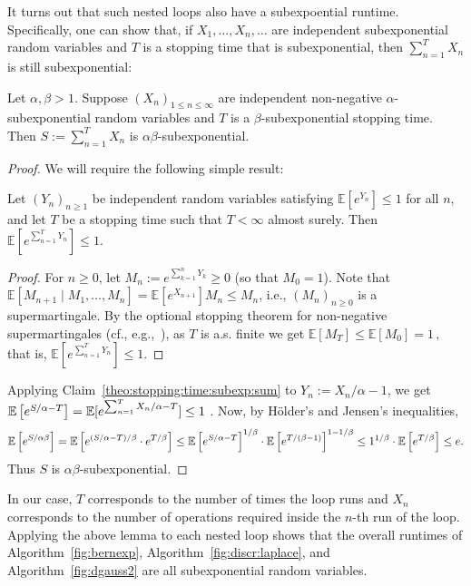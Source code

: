 \documentclass{jpc}
\newcommand{\ex}[2]{{\ifx&#1& \mathbb{E} \else
\underset{#1}{\mathbb{E}} \fi \left[#2\right]}}
\newcommand{\eqdef}{:=}
\begin{document}
It turns out that such nested loops also have a subexpoential runtime. Specifically, one can show that, if $X_1,\dots,X_n,\dots$ are independent subexponential random variables and $T$ is a stopping time that is subexponential, then $\sum_{n=1}^T X_n$ is still subexponential:
\begin{lem}
Let $\alpha,\beta>1$.
Suppose $(X_n)_{1\leq n\leq \infty}$ are independent non-negative $\alpha$-subexponential random variables and $T$ is a $\beta$-subexponential stopping time. Then $S \eqdef \sum_{n=1}^T X_n$ is $\alpha\beta$-subexponential.
\end{lem}
\begin{proof}
We will require the following simple result:
\begin{clm}
  \label{theo:stopping:time:subexp:sum}
Let $(Y_n)_{n\geq 1}$ be independent random variables satisfying $\mathbb{E}[e^{Y_n}] \leq 1$ for all $n$, and let $T$ be a stopping time such that $T < \infty$ almost surely. Then $\mathbb{E}[e^{\sum_{n=1}^T Y_n}] \leq 1$.
\end{clm}
\begin{proof}
    For $n\geq 0$, let $M_n \eqdef e^{\sum_{k=1}^n Y_k} \geq 0$ (so that $M_0=1$). Note that 
    $
      \mathbb{E}[ M_{n+1} \mid M_1,\dots, M_n ] = \mathbb{E}[ e^{X_{n+1}} ] M_n \leq M_n
    $, i.e., $(M_n)_{n\geq 0}$ is a supermartingale. By the optional stopping theorem for non-negative supermartingales (cf., e.g.,~\cite[Corollary~10.10(d)]{Williams91}), as $T$ is a.s. finite we get
    $
        \mathbb{E}[ M_T ] \leq \mathbb{E}[ M_0 ] = 1 \,,
    $
    that is, $\mathbb{E}[ e^{\sum_{n=1}^T Y_n} ] \leq 1$.
\end{proof}
Applying Claim~\ref{theo:stopping:time:subexp:sum} to $Y_n \eqdef X_n/\alpha-1$, we get
$
    \ex{}{e^{S/\alpha-T}}=\mathbb{E}[ e^{\sum_{n=1}^T X_n/\alpha - T} ] \leq 1
$ 
. 
Now, by H\"older's and Jensen's inequalities,
\[
    \ex{}{e^{S/\alpha\beta}} = \ex{}{e^{(S/\alpha-T)/\beta} \cdot e^{T/\beta}} \le \ex{}{e^{S/\alpha-T}}^{1/\beta} \cdot \ex{}{e^{T/(\beta-1)}}^{1-1/\beta} \le 1^{1/\beta} \cdot \ex{}{e^{T/\beta}} \le e.
\]
Thus $S$ is $\alpha\beta$-subexponential.
\end{proof}
In our case, $T$ corresponds to the number of times the loop runs and $X_n$ corresponds to the number of operations required inside the $n$-th run of the loop. Applying the above lemma to each nested loop shows that the overall runtimes of Algorithm~\ref{fig:bernexp}, Algorithm~\ref{fig:discr:laplace}, and Algorithm~\ref{fig:dgauss2} are all subexponential random variables.
\end{document}
